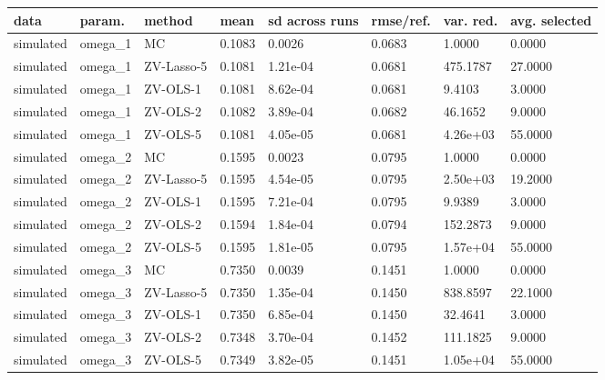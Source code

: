 \begin{tabular}{llllllll}
\toprule
data & param. & method & mean & sd across runs & rmse/ref. & var. red. & avg. selected \\
\midrule
simulated & omega\_1 & MC & 0.1083 & 0.0026 & 0.0683 & 1.0000 & 0.0000 \\
simulated & omega\_1 & ZV-Lasso-5 & 0.1081 & 1.21e-04 & 0.0681 & 475.1787 & 27.0000 \\
simulated & omega\_1 & ZV-OLS-1 & 0.1081 & 8.62e-04 & 0.0681 & 9.4103 & 3.0000 \\
simulated & omega\_1 & ZV-OLS-2 & 0.1082 & 3.89e-04 & 0.0682 & 46.1652 & 9.0000 \\
simulated & omega\_1 & ZV-OLS-5 & 0.1081 & 4.05e-05 & 0.0681 & 4.26e+03 & 55.0000 \\
simulated & omega\_2 & MC & 0.1595 & 0.0023 & 0.0795 & 1.0000 & 0.0000 \\
simulated & omega\_2 & ZV-Lasso-5 & 0.1595 & 4.54e-05 & 0.0795 & 2.50e+03 & 19.2000 \\
simulated & omega\_2 & ZV-OLS-1 & 0.1595 & 7.21e-04 & 0.0795 & 9.9389 & 3.0000 \\
simulated & omega\_2 & ZV-OLS-2 & 0.1594 & 1.84e-04 & 0.0794 & 152.2873 & 9.0000 \\
simulated & omega\_2 & ZV-OLS-5 & 0.1595 & 1.81e-05 & 0.0795 & 1.57e+04 & 55.0000 \\
simulated & omega\_3 & MC & 0.7350 & 0.0039 & 0.1451 & 1.0000 & 0.0000 \\
simulated & omega\_3 & ZV-Lasso-5 & 0.7350 & 1.35e-04 & 0.1450 & 838.8597 & 22.1000 \\
simulated & omega\_3 & ZV-OLS-1 & 0.7350 & 6.85e-04 & 0.1450 & 32.4641 & 3.0000 \\
simulated & omega\_3 & ZV-OLS-2 & 0.7348 & 3.70e-04 & 0.1452 & 111.1825 & 9.0000 \\
simulated & omega\_3 & ZV-OLS-5 & 0.7349 & 3.82e-05 & 0.1451 & 1.05e+04 & 55.0000 \\
\bottomrule
\end{tabular}
